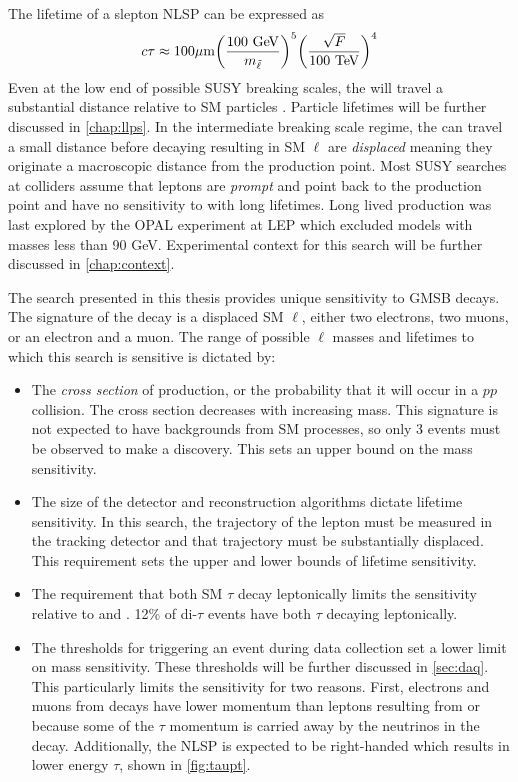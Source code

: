 The lifetime of a slepton \ac{NLSP} can be expressed as
\begin{equation}
   c \tau \approx 100 \um \bigg(\frac{100 \GeV}{m_{\slep}}\bigg)^5\bigg(\frac{\sqrt{F}}{100 \TeV}\bigg)^4
\end{equation}
Even at the low end of possible \ac{SUSY} breaking scales, the \slep will travel a substantial distance relative to \ac{SM} particles \cite{jesseshelton}. Particle lifetimes will be further discussed in \autoref{chap:llps}. In the intermediate breaking scale regime, the \slep can travel a small distance before decaying resulting in \ac{SM} $\ell$ are \emph{displaced} meaning they originate a macroscopic distance from the \slep production point. Most \ac{SUSY} searches at colliders assume that leptons are \emph{prompt} and point back to the \slep production point and have no sensitivity to \slep with long lifetimes. Long lived \slep production was last explored by the OPAL experiment at \ac{LEP} which excluded models with \slep masses less than 90 GeV. Experimental context for this search will be further discussed in \autoref{chap:context}.


The search presented in this thesis provides unique sensitivity to \ac{GMSB} \slep decays. The signature of the decay is a displaced \ac{SM} $\ell$, either two electrons, two muons, or an electron and a muon. The range of possible $\ell$ masses and lifetimes to which this search is sensitive is dictated by:
\begin{itemize}
	\item The \emph{cross section} of \slep production, or the probability that it will occur in a $pp$ collision. The cross section decreases with increasing \slep mass. This signature is not expected to have backgrounds from \ac{SM} processes, so only 3 events must be observed to make a discovery. This sets an upper bound on the mass sensitivity.
	\item The size of the detector and reconstruction algorithms dictate lifetime sensitivity. In this search, the trajectory of the lepton must be measured in the tracking detector and that trajectory must be substantially displaced. This requirement sets the upper and lower bounds of lifetime sensitivity.
	\item The requirement that both \ac{SM} $\tau$ decay leptonically limits the \stau sensitivity relative to \selec and \smu. 12\% of di-$\tau$ events have both $\tau$ decaying leptonically. 
	\item The thresholds for triggering an event during data collection set a lower limit on mass sensitivity. These thresholds will be further discussed in \autoref{sec:daq}. This particularly limits the \stau sensitivity for two reasons. First, electrons and muons from \stau decays have lower momentum than leptons resulting from \selec or \smu because some of the $\tau$ momentum is carried away by the neutrinos in the decay. Additionally, the \stau \ac{NLSP} is expected to be right-handed which results in lower energy $\tau$, shown in \autoref{fig:taupt}. 
\end{itemize}



